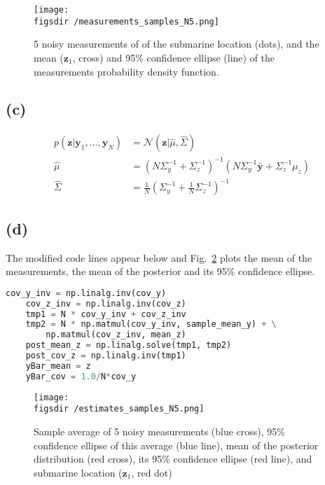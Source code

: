\documentclass[12pt]{article}
\def\figsdir{../../../../../../code/scripts/probability/multivariateGaussians/inferenceInTheLinearGaussianModel/figures/}
\begin{document}
\begin{center}
    \begin{figure}[H]
        \texttt{[image: \\figsdir /measurements\_samples\_N5.png]}

        \caption{5 noisy measurements of of the submarine location (dots), and
        the mean ($\mathbf{z}_1$, cross) and 95\% confidence ellipse (line) of
        the measurements probability density function.}

        \label{fig:b}
    \end{figure}
\end{center}

\subsection*{(c)} 

\begin{align*}
    p(\mathbf{z}|\mathbf{y}_1,\ldots,\mathbf{y}_N)&=\mathcal{N}(\mathbf{z}|\hat{\mu},\hat{\Sigma})\\
    \hat{\mu}&=\left(N\Sigma_y^{-1}+\Sigma_z^{-1}\right)^{-1}\left(N\Sigma_y^{-1}\bar{\mathbf{y}}+\Sigma_z^{-1}\mu_z\right)\\
    \hat{\Sigma}&=\frac{1}{N}\left(\Sigma_y^{-1}+\frac{1}{N}\Sigma_z^{-1}\right)^{-1}
\end{align*}

\subsection*{(d)} The modified code lines appear below and Fig.~\ref{fig:d}
plots the mean of the measurements, the mean of the posterior and its 95\%
confidence ellipse.

\begin{lstlisting}[language=Python]
    cov_y_inv = np.linalg.inv(cov_y)
    cov_z_inv = np.linalg.inv(cov_z)
    tmp1 = N * cov_y_inv + cov_z_inv
    tmp2 = N * np.matmul(cov_y_inv, sample_mean_y) + \
        np.matmul(cov_z_inv, mean_z)
    post_mean_z = np.linalg.solve(tmp1, tmp2)
    post_cov_z = np.linalg.inv(tmp1)
    yBar_mean = z
    yBar_cov = 1.0/N*cov_y
\end{lstlisting}

\begin{center}
    \begin{figure}[H]
        \texttt{[image: \\figsdir /estimates\_samples\_N5.png]}
        \caption{Sample average of 5 noisy measurements (blue cross), 95\%
        confidence ellipse of this average (blue line), mean of the posterior
        distribution (red cross), its 95\% confidence ellipse (red line), and
        submarine location ($\mathbf{z}_1$, red dot)}
        \label{fig:d}
    \end{figure}
\end{center}
\end{document}

